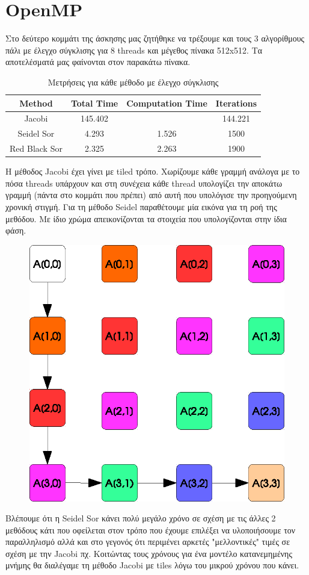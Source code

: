 \documentclass[11pt,a4paper]{article}
\begin{document}
\section*{OpenMP}
Στο δεύτερο κομμάτι της άσκησης μας ζητήθηκε να τρέξουμε και τους 3 αλγορίθμους πάλι με έλεγχο σύγκλισης για 8 threads και μέγεθος πίνακα 512x512. Τα αποτελέσματά
μας φαίνονται στον παρακάτω πίνακα.
\begin{table}[!h]
    \centering
    \begin{tabular}{|c|c|c|c|}
        \hline
        Method & Total Time & Computation Time & Iterations \\
        \hline
        \hline
        Jacobi & 145.402 &  & 144.221 \\
        \hline 
        Seidel Sor & 4.293 & 1.526  & 1500 \\
        \hline
        Red Black Sor & 2.325 & 2.263 & 1900 \\
        \hline
    \end{tabular}
    \caption{Μετρήσεις για κάθε μέθοδο με έλεγχο σύγκλισης}
\end{table}
H μέθοδος Jacobi έχει γίνει με tiled τρόπο. Χωρίζουμε κάθε γραμμή ανάλογα με το πόσα threads υπάρχουν και στη συνέχεια κάθε thread υπολογίζει την αποκάτω γραμμή
(πάντα στο κομμάτι που πρέπει) από αυτή που υπολόγισε την προηγούμενη χρονική στιγμή. Για τη μέθοδο Seidel παραθέτουμε μία εικόνα για τη ροή της μεθόδου. Με ίδιο 
χρώμα απεικονίζονται τα στοιχεία που υπολογίζονται στην ίδια φάση.
\begin{figure}
    \centering
    \includegraphics[scale=0.7]{seidelFlow.eps}
\end{figure}
Βλέπουμε ότι η Seidel Sor κάνει πολύ μεγάλο χρόνο σε σχέση με τις άλλες 2 μεθόδους κάτι που οφείλεται στον τρόπο που έχουμε επιλέξει να υλοποιήσουμε τον 
παραλληλισμό αλλά και στο γεγονός ότι περιμένει αρκετές "μελλοντικές" τιμές σε σχέση με την Jacobi πχ. 
Κοιτώντας τους χρόνους για ένα μοντέλο κατανεμημένης μνήμης θα διαλέγαμε τη μέθοδο Jacobi με tiles λόγω του μικρού χρόνου που κάνει.
\end{document}
